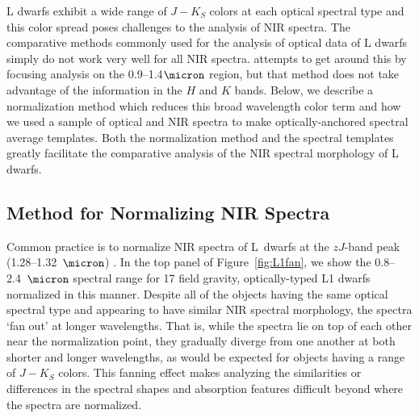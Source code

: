 \documentclass[12pt,preprint]{aastex}
\begin{document}
L dwarfs exhibit a wide range of $J-K_S$ colors at each optical spectral type \cite[e.g.,][]{Kirkpatrick08, Schmidt10, Faherty:2012cy} and this color spread poses challenges to the analysis of NIR spectra. 
The comparative methods commonly used for the analysis of optical data of L dwarfs simply do not work very well for all NIR spectra.
\citet{Kirkpatrick10} attempts to get around this by focusing analysis on the 0.9--1.4$\micron$ region, but that method does not take advantage of the information in the $H$ and $K$ bands.
Below, we describe a normalization method which reduces this broad wavelength color term and how we used a sample of optical and NIR spectra to make optically-anchored spectral average templates. 
Both the normalization method and the spectral templates greatly facilitate the comparative analysis of the NIR spectral morphology of L dwarfs.

\subsection{Method for Normalizing NIR Spectra}
\label{sec:method}

Common practice is to normalize NIR spectra of L~dwarfs at the $zJ$-band peak (1.28--1.32~$\micron$) \citep[e.g.,][]{Kirkpatrick10}. 
In the top panel of Figure~\ref{fig:L1fan}, we show the 0.8--2.4~$\micron$ spectral range for 17 field gravity, optically-typed L1 dwarfs normalized in this manner.
Despite all of the objects having the same optical spectral type and appearing to have similar NIR spectral morphology, the spectra `fan out' at longer wavelengths. 
That is, while the spectra lie on top of each other near the normalization point, they gradually diverge from one another at both shorter and longer wavelengths, as would be expected for objects having a range of $J-K_S$ colors. 
This fanning effect makes analyzing the similarities or differences in the spectral shapes and absorption features difficult beyond where the spectra are normalized.

\end{document}
